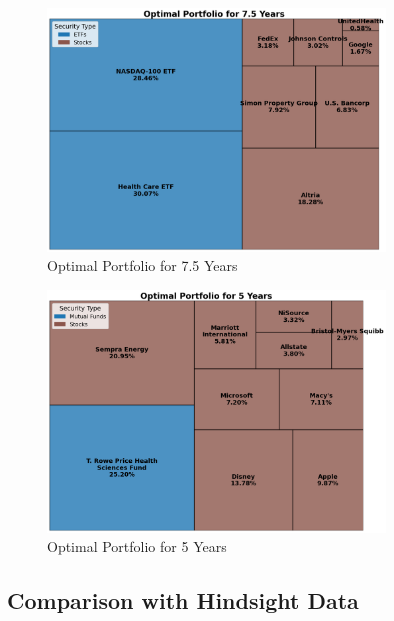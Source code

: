 \begin{figure}[!htbp]
    \centering
    \includegraphics[width=0.8\textwidth]{../Figures/optimal_portfolio_7_5_years.png}
    \caption{Optimal Portfolio for 7.5 Years}
    \label{fig:optimal_portfolio_7_5y}
\end{figure}

\begin{figure}[!htbp]
    \centering
    \includegraphics[width=0.8\textwidth]{../Figures/optimal_portfolio_5_years.png}
    \caption{Optimal Portfolio for 5 Years}
    \label{fig:optimal_portfolio_5y}
\end{figure}


\newpage

\subsection{Comparison with Hindsight Data}


